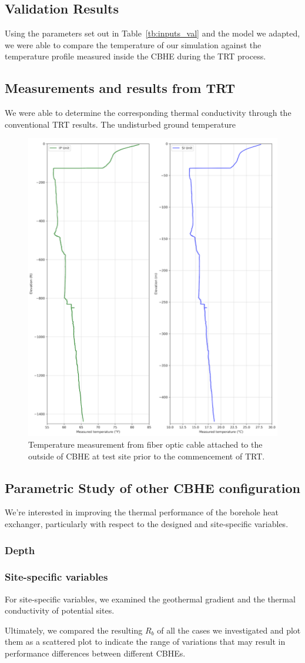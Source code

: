 \subsection{Validation Results}
	Using the parameters set out in Table~\ref{tb:inputs_val} and the model we adapted, we were able to compare the temperature of our simulation against the temperature profile measured inside the CBHE during the TRT process. 
\subsection{Measurements and results from TRT}
	We were able to determine the corresponding thermal conductivity through the conventional TRT results. The undisturbed ground temperature 
	\begin{figure}[h!]
	\centering
	\includegraphics[height=0.5\textwidth]{data/groudref}
	\caption{Temperature measurement from fiber optic cable attached to the outside of CBHE at test site prior to the commencement of TRT.}	
	\end{figure}


\subsection{Parametric Study of other CBHE configuration}
	We're interested in improving the thermal performance of the borehole heat exchanger, particularly with respect to the designed and site-specific variables. 
	\subsubsection{Depth}
	
	\subsubsection{Site-specific variables}
	For site-specific variables, we examined the geothermal gradient and the thermal conductivity of potential sites. 
	
	Ultimately, we compared the resulting $R_b$ of all the cases we investigated and plot them as a scattered plot to indicate the range of variations that may result in performance differences between different CBHEs. 
	